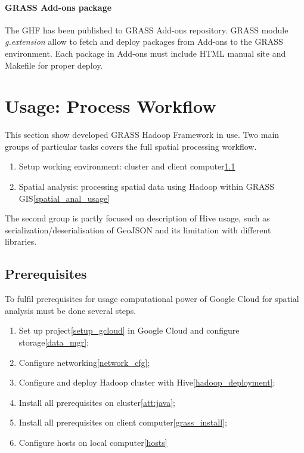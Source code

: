 \documentclass[a4paper,12pt,oneside]{report}
\begin{document}

	\paragraph{GRASS Add-ons package} The GHF has been published to GRASS Add-ons
	repository. GRASS module \textit{g.extension} allow to fetch and deploy packages
	from Add-ons to the GRASS environment. Each package in Add-ons must include HTML
	manual site and Makefile for proper deploy. 
	
	
	
	\section{Usage: Process Workflow}\label{sec:usage_spatial}
	This section show  developed GRASS Hadoop Framework in use.  Two main groups of particular tasks covers the full spatial processing workflow.
	\begin{enumerate}
	\item Setup working environment: cluster and client computer\ref{prereq}
	\item Spatial analysis: processing spatial data using Hadoop within GRASS GIS\ref{spatial_anal_usage}
	\end{enumerate}
	The second group is partly focused on description of
	Hive usage, such as serialization/deserialisation of GeoJSON
	and its limitation with different libraries.
	
	\subsection{Prerequisites}\label{prereq}
	To fulfil prerequisites  for usage computational power of Google Cloud for spatial analysis must be done several steps.
	

	\begin{enumerate}
	\item Set up project\ref{setup_gcloud} in Google Cloud and configure storage\ref{data_mgr};
	\item Configure networking\ref{network_cfg};
	\item Configure and deploy Hadoop cluster with Hive\ref{hadoop_deployment};
	\item Install all prerequisites on cluster\ref{att:java};
	\item Install all prerequisites on client computer\ref{grass_install};
	\item Configure hosts on local computer\ref{hosts}
	\end{enumerate}
	
\end{document}
